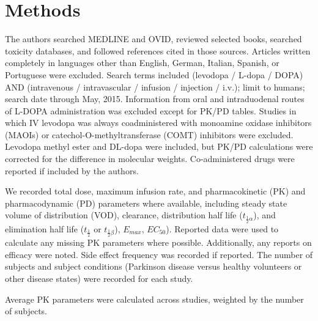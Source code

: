 \section{Methods}
The authors searched MEDLINE and OVID, reviewed selected books, searched toxicity databases, and followed references cited in those sources. Articles written completely in languages other than English, German, Italian, Spanish, or Portuguese were excluded. Search terms included (levodopa / L-dopa / DOPA) AND (intravenous / intravascular / infusion / injection / i.v.); limit to humans; search date through May, 2015. Information from oral and intraduodenal routes of L-DOPA administration was excluded except for PK/PD tables.  Studies in which IV levodopa was always coadministered with monoamine oxidase inhibitors (MAOIs) or catechol-O-methyltransferase (COMT) inhibitors were excluded.  Levodopa methyl ester \cite{3601092} and DL-dopa \cite{14430381} were included, but PK/PD calculations were corrected for the difference in molecular weights.  Co-administered drugs were reported if included by the authors.

We recorded total dose, maximum infusion rate, and pharmacokinetic (PK) and pharmacodynamic (PD) parameters where available, including steady state volume of distribution (VOD), clearance, distribution half life ($t_{\frac{1}{2}\alpha}$), and elimination half life ($t_{\frac{1}{2}}$ or $t_{\frac{1}{2}\beta}$), $E_{max}$, $EC_{50}$). Reported data were used to calculate any missing PK parameters where possible.  Additionally, any reports on efficacy were noted.  Side effect frequency was recorded if reported. The number of subjects and subject conditions (Parkinson disease versus healthy volunteers or other disease states) were recorded for each study. 

Average PK parameters were calculated across studies, weighted by the number of subjects.